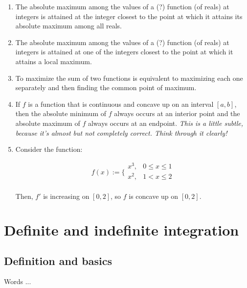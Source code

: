 \documentclass[10pt]{amsart}
\begin{document}
\begin{enumerate}
\item The absolute maximum among the values of a (?) function (of reals)
  at integers is attained at the integer closest to the point at which
  it attains its absolute maximum among all reals.
\item The absolute maximum among the values of a (?) function (of reals)
  at integers is attained at one of the integers closest to the point
  at which it attains a local maximum.
\item To maximize the sum of two functions is equivalent to maximizing
  each one separately and then finding the common point of maximum.
\item If $f$ is a function that is continuous and concave up on an
  interval $[a,b]$, then the absolute minimum of $f$ always occurs at
  an interior point and the absolute maximum of $f$ always occurs at
  an endpoint. {\em This is a little subtle, because it's almost but
  not completely correct. Think through it clearly!}
\item Consider the function:

  $$f(x) := \lbrace\begin{array}{rl} x^3, & 0 \le x \le 1 \\ x^2, & 1 < x \le 2 \\\end{array}$$

  Then, $f'$ is increasing on $[0,2]$, so $f$ is concave up on
  $[0,2]$.
\end{enumerate}

\section{Definite and indefinite integration}

\subsection{Definition and basics}

Words ...
\end{document}
